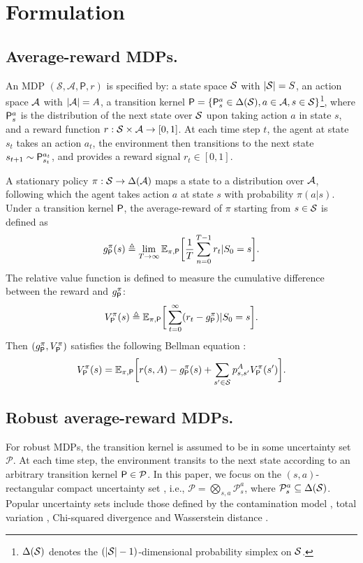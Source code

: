 \section{Formulation}


\subsection{Average-reward MDPs.}
An MDP  $(\mathcal{S},\mathcal{A}, \mathsf P, r)$ is specified by: a state space $\mathcal{S}$ with $|\mathcal{S}|=S$, an action space $\mathcal{A}$ with $|\mathcal{A}|=A$, a transition kernel $\mathsf P=\left\{\mathsf P^a_s \in \Delta(\mathcal{S}), a\in\mathcal{A}, s\in\mathcal{S}\right\}$\footnote{$\Delta(\mathcal{S})$ denotes the $(|\mathcal{S}|-1)$-dimensional probability simplex on $\mathcal{S}$. }, where $\mathsf P^a_s$ is the distribution of the next state over $\mathcal{S}$ upon taking action $a$ in state $s$, and a reward function $r: \mathcal{S}\times\mathcal{A} \to [0,1]$. At each time step $t$, the agent at state $s_t$ takes an action $a_t$, the  environment then transitions to the next state $s_{t+1}\sim \mathsf P^{a_t}_{s_t}$, and provides a reward signal $r_t\in [0,1]$. 

A stationary policy $\pi: \mathcal{S}\to \Delta(\mathcal{A})$ maps a state to a distribution over $\mathcal{A}$, following which the agent takes action $a$ at state $s$ with probability $\pi(a|s)$. 
Under a transition kernel $\mathsf P$, the average-reward of $\pi$ starting from $s\in\mathcal{S}$ is defined as
\begin{align}
    g_\mathsf P^\pi(s)\triangleq \lim_{T\to\infty} \mathbb{E}_{\pi,\mathsf P}\bigg[\frac{1}{T}\sum^{T-1}_{n=0} r_t|S_0=s \bigg].
\end{align}
The relative value function is defined to measure the cumulative difference between the reward and  $g^\pi_\mathsf P$:
\begin{align}\label{eq:relativevaluefunction}
    V^\pi_\mathsf P(s)\triangleq \mathbb{E}_{\pi,\mathsf P}\bigg[\sum^\infty_{t=0} (r_t-g^\pi_\mathsf P)|S_0=s \bigg].
\end{align}
Then $(g^\pi_\mathsf P, V^\pi_\mathsf P)$  satisfies the following Bellman equation \citep{puterman1994markov}:
\begin{align}
    V^\pi_\mathsf P(s)=\mathbb{E}_{\pi,\mathsf P}\bigg[r(s,A)-g^\pi_\mathsf P(s)+\sum_{s'\in\mathcal{S}} p^A_{s,s'}V^\pi_\mathsf P (s') \bigg]. 
\end{align}

\subsection{Robust average-reward MDPs.} \label{sec:ramdp}
For robust MDPs, the transition kernel is assumed to be in some uncertainty set $\mathcal{P}$. At each time step, the environment transits to the next state according to an arbitrary transition kernel $\mathsf P\in\mathcal{P}$. In this paper, we focus on the $(s,a)$-rectangular compact uncertainty set \citep{nilim2004robustness,iyengar2005robust}, i.e., $\mathcal{P}=\bigotimes_{s,a} \mathcal{P}^a_s$, where $\mathcal{P}^a_s \subseteq \Delta(\mathcal{S})$. Popular uncertainty sets include those defined by the contamination model \citep{hub65,wang2022policy},  total variation \citep{lim2013reinforcement}, Chi-squared divergence \citep{iyengar2005robust} and Wasserstein distance \citep{gao2022distributionally}.

